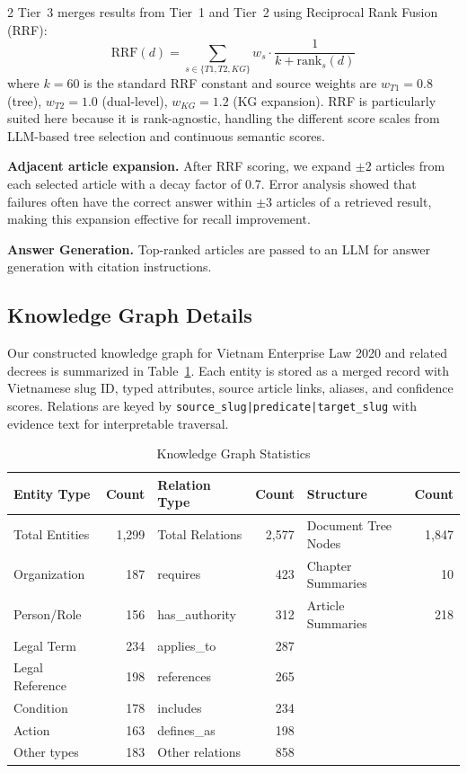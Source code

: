 \documentclass[11pt,a4paper]{article}
\begin{document}
\begin{multicols}{2}
Tier~3 merges results from Tier~1 and Tier~2 using Reciprocal Rank Fusion (RRF):
\begin{equation}
\text{RRF}(d) = \sum_{s \in \{T1, T2, KG\}} w_s \cdot \frac{1}{k + \text{rank}_s(d)}
\end{equation}
where $k=60$ is the standard RRF constant and source weights are $w_{T1}=0.8$ (tree), $w_{T2}=1.0$ (dual-level), $w_{KG}=1.2$ (KG expansion). RRF is particularly suited here because it is rank-agnostic, handling the different score scales from LLM-based tree selection and continuous semantic scores.

\textbf{Adjacent article expansion.} After RRF scoring, we expand $\pm 2$ articles from each selected article with a decay factor of 0.7. Error analysis showed that failures often have the correct answer within $\pm 3$ articles of a retrieved result, making this expansion effective for recall improvement.

\textbf{Answer Generation.} Top-ranked articles are passed to an LLM for answer generation with citation instructions.

\subsection{Knowledge Graph Details}

Our constructed knowledge graph for Vietnam Enterprise Law 2020 and related decrees is summarized in Table~\ref{tab:kg-stats}. Each entity is stored as a merged record with Vietnamese slug ID, typed attributes, source article links, aliases, and confidence scores. Relations are keyed by \texttt{source\_slug|predicate|target\_slug} with evidence text for interpretable traversal.

\end{multicols}

\begin{table}[H]
\centering\small
\caption{Knowledge Graph Statistics}
\label{tab:kg-stats}
\begin{tabular}{lr@{\hskip 2cm}lr@{\hskip 2cm}lr}
\toprule
\textbf{Entity Type} & \textbf{Count} & \textbf{Relation Type} & \textbf{Count} & \textbf{Structure} & \textbf{Count} \\
\midrule
Total Entities & 1,299 & Total Relations & 2,577 & Document Tree Nodes & 1,847 \\
Organization & 187 & requires & 423 & Chapter Summaries & 10 \\
Person/Role & 156 & has\_authority & 312 & Article Summaries & 218 \\
Legal Term & 234 & applies\_to & 287 & & \\
Legal Reference & 198 & references & 265 & & \\
Condition & 178 & includes & 234 & & \\
Action & 163 & defines\_as & 198 & & \\
Other types & 183 & Other relations & 858 & & \\
\bottomrule
\end{tabular}
\end{table}
\end{document}
